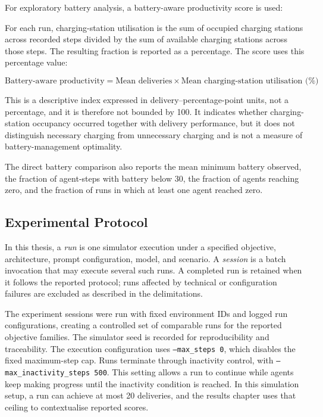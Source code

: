 For exploratory battery analysis, a battery-aware productivity score is used:

For each run, charging-station utilisation is the sum of occupied charging stations across recorded steps divided by the sum of available charging stations across those steps. The resulting fraction is reported as a percentage. The score uses this percentage value:

\begin{equation}
    \text{Battery-aware productivity} =
    \text{Mean deliveries} \times \text{Mean charging-station utilisation (\%)}
    \label{eq:battery-aware-productivity}
\end{equation}

This is a descriptive index expressed in delivery--percentage-point units, not a percentage, and it is therefore not bounded by 100.
It indicates whether charging-station occupancy occurred together with delivery performance, but it does not distinguish necessary charging from unnecessary charging and is not a measure of battery-management optimality.

The direct battery comparison also reports the mean minimum battery observed, the fraction of agent-steps with battery below 30, the fraction of agents reaching zero, and the fraction of runs in which at least one agent reached zero.

\subsection{Experimental Protocol}
In this thesis, a \emph{run} is one simulator execution under a specified objective, architecture, prompt configuration, model, and scenario. A \emph{session} is a batch invocation that may execute several such runs. A completed run is retained when it follows the reported protocol; runs affected by technical or configuration failures are excluded as described in the delimitations.

The experiment sessions were run with fixed environment IDs and logged run configurations, creating a controlled set of comparable runs for the reported objective families.
The simulator seed is recorded for reproducibility and traceability.
The execution configuration uses \texttt{--max\_steps 0}, which disables the fixed maximum-step cap.
Runs terminate through inactivity control, with \texttt{--max\_inactivity\_steps 500}.
This setting allows a run to continue while agents keep making progress until the inactivity condition is reached.
In this simulation setup, a run can achieve at most 20 deliveries, and the results chapter uses that ceiling to contextualise reported scores.

